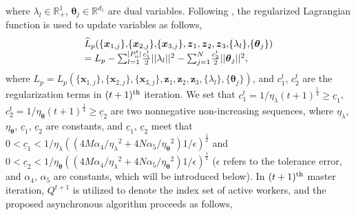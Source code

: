 \documentclass[letterpaper]{article} %
\begin{document}
where $\lambda _l\!\in\!\mathbb{R}^1_{+}$, $\boldsymbol{\theta}_j\!\in\!\mathbb{R}^{d_1}$ are dual variables. Following \cite{xu2020unified,jiao2022asynchronous}, the regularized Lagrangian function is used to update variables as follows,
\begin{equation}
\begin{array}{l}
\widehat{L}_p(\{{\boldsymbol{x}_{1,j}}\} ,\!\{{\boldsymbol{x}_{2,j}}\} ,\!\{{\boldsymbol{x}_{3,j}}\} ,{\boldsymbol{z}_1},{\boldsymbol{z}_2},{\boldsymbol{z}_3},\! \{\lambda_l\}, \!\{\boldsymbol{\theta}_j\} ) \\ = {L_p} - \sum\nolimits_{l = 1}^{|P_{{\rm{\uppercase\expandafter{\romannumeral2}}}}^{t}|} \!\frac{c_1^t}{2}||\lambda_l||^2 - \sum\nolimits_{j = 1}^{N}\! \frac{c_2^t}{2}||\boldsymbol{\theta}_j||^2,
\end{array}
\end{equation}
where $L_p\!=\!L_p(\{{\boldsymbol{x}_{1,j}}\} ,\!\{{\boldsymbol{x}_{2,j}}\} ,\!\{{\boldsymbol{x}_{3,j}}\} ,\!{\boldsymbol{z}_1},\!{\boldsymbol{z}_2},\!{\boldsymbol{z}_3},\! \{\lambda_l\}, \!\{\boldsymbol{\theta}_j\} )$, and $c_1^t$, $c_2^t$ are the regularization terms in $(t+1)^{\rm{th}}$ iteration. We set that ${c_1^t} =1/{{{\eta _{{\lambda}}}}{(t+1)^{\frac{1}{4}}}} \ge  \underline{c}_1$, ${c_2^t} = 1/{{{\eta _{{\boldsymbol{\theta }}}}}{(t+1)^{\frac{1}{4}}}}  \ge  \underline{c}_2$ are two nonnegative non-increasing sequences, where $\eta _{{\lambda}}$, $\eta _{{\boldsymbol{\theta }}}$, $\underline{c}_1$, $\underline{c}_2$ are constants, and $\underline{c}_1$, $\underline{c}_2$ meet that $0\!<\!\underline{c}_1\!<\!1/\eta _{{\lambda}}({({{4M\alpha_4}} / {{{{\eta _{\lambda}}}^2}} \!+\! {{4N\alpha_5}}/{{{{\eta _{\boldsymbol{\theta }}}}^2}})}1/\epsilon)^{\frac{1}{2}}$ and $0\!<\!\underline{c}_2\!<\!1/\eta _{{\boldsymbol{\theta }}} ({({{4M\alpha_4}} / {{{{\eta _{\lambda}}}^2}} \!+\! {{4N\alpha_5}}/{{{{\eta _{\boldsymbol{\theta }}}}^2}})}1/\epsilon)^{\frac{1}{2}}$ ($\epsilon$ refers to the tolerance error, and $\alpha_4$, $\alpha_5$ are constants, which will be introduced below). In $(t+1)^{\rm{th}}$ master iteration, $Q^{t+1} $ is utilized to denote the index set of active workers, and the proposed asynchronous algorithm proceeds as follows,
\end{document}
